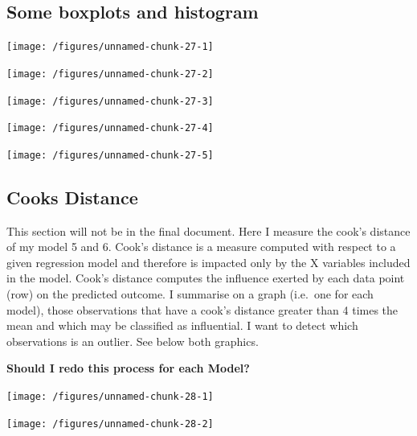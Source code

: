 \documentclass[12pt,]{article}
\begin{document}
\subsection{Some boxplots and
histogram}\label{some-boxplots-and-histogram}

\begin{center}\texttt{[image: /figures/unnamed-chunk-27-1]} \end{center}

\begin{center}\texttt{[image: /figures/unnamed-chunk-27-2]} \end{center}

\begin{center}\texttt{[image: /figures/unnamed-chunk-27-3]} \end{center}

\begin{center}\texttt{[image: /figures/unnamed-chunk-27-4]} \end{center}

\begin{center}\texttt{[image: /figures/unnamed-chunk-27-5]} \end{center}

\newpage

\subsection{Cooks Distance}\label{cooks-distance}

This section will not be in the final document. Here I measure the
cook's distance of my model 5 and 6. Cook's distance is a measure
computed with respect to a given regression model and therefore is
impacted only by the X variables included in the model. Cook's distance
computes the influence exerted by each data point (row) on the predicted
outcome. I summarise on a graph (i.e.~one for each model), those
observations that have a cook's distance greater than 4 times the mean
and which may be classified as influential. I want to detect which
observations is an outlier. See below both graphics.

\textbf{Should I redo this process for each Model?}

\begin{center}\texttt{[image: /figures/unnamed-chunk-28-1]} \end{center}

\begin{center}\texttt{[image: /figures/unnamed-chunk-28-2]} \end{center}
\end{document}
